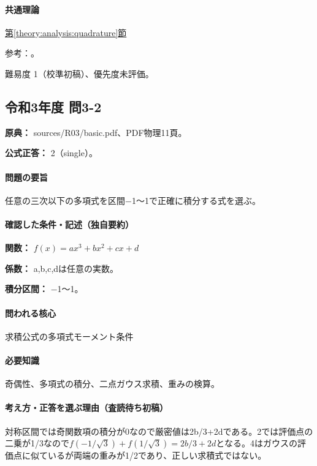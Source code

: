 \paragraph{共通理論} \hyperref[theory:analysis:quadrature]{第\ref*{theory:analysis:quadrature}節}

\par 参考：\cite{nist_quadrature}。

\par 難易度 1（校準初稿）、優先度未評価。

\subsection{令和3年度 問3-2}
\label{q:r03-reg-basic-3-2}

\noindent\textbf{原典：} sources/R03/basic.pdf、PDF物理11頁。

\textbf{公式正答：} 2（single）。

\paragraph{問題の要旨} 任意の三次以下の多項式を区間−1〜1で正確に積分する式を選ぶ。

\paragraph{確認した条件・記述（独自要約）}\mbox{}\par

\noindent\textbf{関数：} \(f(x)=ax^3+bx^2+cx+d\)\par

\noindent\textbf{係数：} a,b,c,dは任意の実数。\par

\noindent\textbf{積分区間：} −1〜1。\par

\paragraph{問われる核心} 求積公式の多項式モーメント条件

\paragraph{必要知識} 奇偶性、多項式の積分、二点ガウス求積、重みの検算。

\paragraph{考え方・正答を選ぶ理由（査読待ち初稿）} 対称区間では奇関数項の積分が0なので厳密値は2b/3+2dである。2では評価点の二乗が1/3なので\(f(-1/\sqrt3)+f(1/\sqrt3)=2b/3+2d\)となる。4はガウスの評価点に似ているが両端の重みが1/2であり、正しい求積式ではない。

